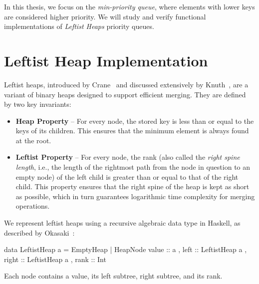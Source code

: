 In this thesis, we focus on the \emph{min-priority queue}, where elements with lower keys are considered higher priority.
We will study and verify functional implementations of \emph{Leftist Heaps} priority queues.


\section{Leftist Heap Implementation}

Leftist heaps, introduced by Crane~\cite{crane1972} and discussed extensively by
Knuth~\cite{knuth1973taocp3}, are a variant of binary heaps designed to support
efficient merging. They are defined by two key invariants:

\begin{itemize}
	\item \textbf{Heap Property} – For every node, the stored key is less than or equal
	      to the keys of its children. This ensures that the minimum element is always
	      found at the root.

	\item \textbf{Leftist Property} – For every node, the rank (also called the
	      \emph{right spine length}, i.e., the length of the rightmost path from the node in question to an empty node)
	      of the left child is greater than or equal to that of the right child.
	      This property ensures that the right spine of the heap is kept as short as
	      possible, which in turn guarantees logarithmic time complexity for merging
	      operations\cite{okasaki}.
\end{itemize}

We represent leftist heaps using a recursive algebraic data type in Haskell, as described by Okasaki~\cite{okasaki}:
\begin{code}[caption={Leftist Heap data type}, label={lst:leftist}]
	data LeftistHeap a
	= EmptyHeap
	| HeapNode
		{ value :: a
			, left  :: LeftistHeap a
			, right :: LeftistHeap a
			, rank  :: Int
		}
\end{code}

Each node contains a value, its left subtree, right subtree, and its rank.


